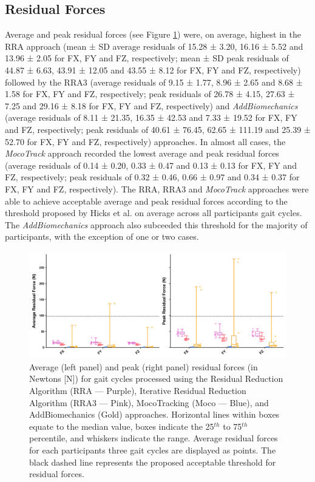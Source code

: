 \documentclass[]{elsarticle} %
\begin{document}
\hypertarget{residual-forces}{%
\subsection{Residual Forces}\label{residual-forces}}

Average and peak residual forces (see Figure \ref{fig:residualForces})
were, on average, highest in the RRA approach (mean ± SD average
residuals of 15.28 ± 3.20, 16.16 ± 5.52 and 13.96 ± 2.05 for FX, FY and
FZ, respectively; mean ± SD peak residuals of 44.87 ± 6.63, 43.91 ±
12.05 and 43.55 ± 8.12 for FX, FY and FZ, respectively) followed by the
RRA3 (average residuals of 9.15 ± 1.77, 8.96 ± 2.65 and 8.68 ± 1.58 for
FX, FY and FZ, respectively; peak residuals of 26.78 ± 4.15, 27.63 ±
7.25 and 29.16 ± 8.18 for FX, FY and FZ, respectively) and
\emph{AddBiomechanics} (average residuals of 8.11 ± 21.35, 16.35 ± 42.53
and 7.33 ± 19.52 for FX, FY and FZ, respectively; peak residuals of
40.61 ± 76.45, 62.65 ± 111.19 and 25.39 ± 52.70 for FX, FY and FZ,
respectively) approaches. In almost all cases, the \emph{MocoTrack}
approach recorded the lowest average and peak residual forces (average
residuals of 0.14 ± 0.20, 0.33 ± 0.47 and 0.13 ± 0.13 for FX, FY and FZ,
respectively; peak residuals of 0.32 ± 0.46, 0.66 ± 0.97 and 0.34 ± 0.37
for FX, FY and FZ, respectively). The RRA, RRA3 and \emph{MocoTrack}
approaches were able to achieve acceptable average and peak residual
forces according to the threshold proposed by Hicks et al.
\citep{Hicks2015} on average across all participants gait cycles. The
\emph{AddBiomechanics} approach also subceeded this threshold for the
majority of participants, with the exception of one or two cases.

\begin{figure}

{\centering \includegraphics[width=1\linewidth]{../results/HamnerDelpDataset/figures/residualForces} 

}

\caption{Average (left panel) and peak (right panel) residual forces (in Newtons [N]) for gait cycles processed using the Residual Reduction Algorithm (RRA — Purple), Iterative Residual Reduction Algorithm  (RRA3 — Pink), MocoTracking (Moco — Blue), and AddBiomechanics (Gold) approaches. Horizontal lines within boxes equate to the median value, boxes indicate the 25$^{th}$ to 75$^{th}$ percentile, and whiskers indicate the range. Average residual forces for each participants three gait cycles are displayed as points. The black dashed line represents the proposed acceptable threshold for residual forces.}\label{fig:residualForces}
\end{figure}
\end{document}
